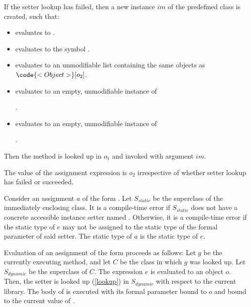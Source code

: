 \documentclass[makeidx]{article}
\begin{document}
{\LMHash{}%
If the setter lookup has failed, then a new instance $im$ of the predefined class  is created, such that:
\begin{itemize}
\item {} evaluates to \code{\TRUE{}}.
\item {} evaluates to the symbol .
\item {} evaluates to an unmodifiable list
  containing the same objects as
  $\code{<Object>}[o_2]$.
\item {} evaluates to an empty, unmodifiable instance of

  .
\item {} evaluates to an empty, unmodifiable instance of

  .
\end{itemize}

\LMHash{}%
Then the method  is looked up in $o_1$ and invoked with argument $im$.


\LMHash{}%
The value of the assignment expression is $o_2$ irrespective of whether setter lookup has failed or succeeded.
\EndCase

\LMHash{}%
Consider an assignment $a$ of the form .
Let $S_{static}$ be the superclass of the immediately enclosing class.
It is a compile-time error if $S_{static}$ does not have a concrete accessible instance setter named .
Otherwise, it is a compile-time error if the static type of $e$
may not be assigned to the static type of the formal parameter of said setter.
The static type of $a$ is the static type of $e$.

\LMHash{}%
Evaluation of an assignment of the form 
proceeds as follows:
Let $g$ be the currently executing method, and let $C$ be the class in which $g$ was looked up.
Let $S_{dynamic}$ be the superclass of $C$.
The expression $e$ is evaluated to an object $o$.
Then, the setter  is looked up (\ref{lookup}) in $S_{dynamic}$ with respect to the current library.
The body of  is executed with its formal parameter bound to $o$
and \THIS{} bound to the current value of \THIS{}.

}
\end{document}
